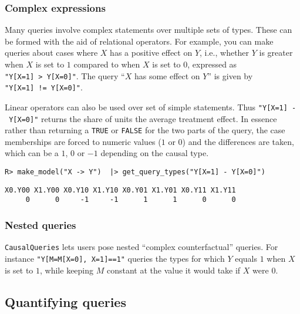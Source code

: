 \documentclass[
  11pt,
  article]{jss}
\begin{document}
\hypertarget{complex-expressions}{%
\subsubsection{Complex expressions}\label{complex-expressions}}

Many queries involve complex statements over multiple sets of types.
These can be formed with the aid of relational operators. For example,
you can make queries about cases where \(X\) has a positive effect on
\(Y\), i.e., whether \(Y\) is greater when \(X\) is set to \(1\)
compared to when \(X\) is set to \(0\), expressed as
\texttt{"Y{[}X=1{]}\ \textgreater{}\ Y{[}X=0{]}"}. The query ``\(X\) has
some effect on \(Y\)'' is given by
\texttt{"Y{[}X=1{]}\ !=\ Y{[}X=0{]}"}.

Linear operators can also be used over set of simple statements. Thus
\texttt{"Y{[}X=1{]}\ -\ Y{[}X=0{]}"} returns the share of units the
average treatment effect. In essence rather than returning a
\texttt{TRUE} or \texttt{FALSE} for the two parts of the query, the case
memberships are forced to numeric values (\(1\) or \(0\)) and the
differences are taken, which can be a \(1\), \(0\) or \(-1\) depending
on the causal type.

\begin{verbatim}
R> make_model("X -> Y")  |> get_query_types("Y[X=1] - Y[X=0]")
\end{verbatim}

\begin{verbatim}
X0.Y00 X1.Y00 X0.Y10 X1.Y10 X0.Y01 X1.Y01 X0.Y11 X1.Y11 
     0      0     -1     -1      1      1      0      0 
\end{verbatim}

\hypertarget{nested-queries}{%
\subsubsection{Nested queries}\label{nested-queries}}

\texttt{CausalQueries} lets users pose nested ``complex counterfactual''
queries. For instance \texttt{"Y{[}M=M{[}X=0{]},\ X=1{]}==1"} queries
the types for which \(Y\) equals \(1\) when \(X\) is set to \(1\), while
keeping \(M\) constant at the value it would take if \(X\) were \(0\).

\hypertarget{quantifying-queries}{%
\subsection{Quantifying queries}\label{quantifying-queries}}
\end{document}
